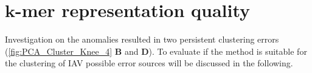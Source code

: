 \section{\texorpdfstring{$\bm{k}$}{k}-mer representation quality} \label{sec:K_mer_Representation}

Investigation on the anomalies resulted in two persistent clustering errors (\autoref{fig:PCA_Cluster_Knee_4} \textbf{\textsf{B}} and \textbf{\textsf{D}}). To evaluate if the method is suitable for the clustering of \gls{IAV} possible error sources will be discussed in the following.




